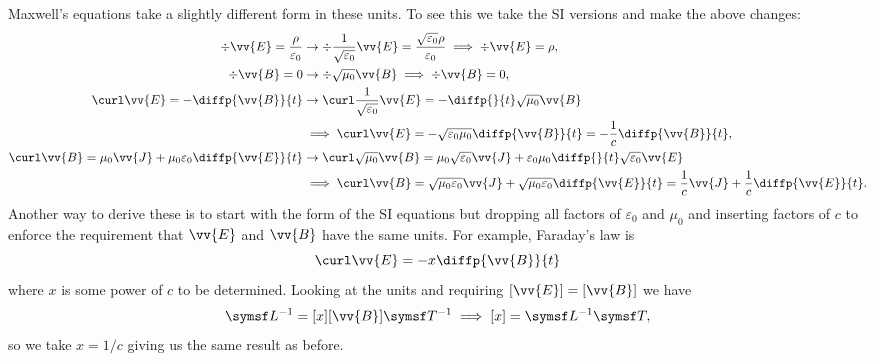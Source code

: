 Maxwell's equations take a slightly different form in these units.
To see this we take the SI versions and make the above changes:
\begin{alignat}{4}
    \div\vv{E} = \frac{\rho}{\varepsilon_0} &\to \div \frac{1}{\sqrt{\varepsilon_0}}\vv{E} = \frac{\sqrt{\varepsilon_0}\rho}{\varepsilon_0} \implies \div\vv{E} = \rho,\\
    \div\vv{B} = 0 &\to \div \sqrt{\mu_0}\vv{B} \implies \div\vv{B} = 0,\\
    \curl\vv{E} = -\diffp{\vv{B}}{t} &\to \curl\frac{1}{\sqrt{\varepsilon_0}}\vv{E} = -\diffp{}{t}\sqrt{\mu_0}\vv{B}\notag\\
    &\implies \curl\vv{E} = -\sqrt{\varepsilon_0\mu_0}\diffp{\vv{B}}{t} = -\frac{1}{c}\diffp{\vv{B}}{t},\\
    \curl\vv{B} = \mu_0\vv{J} + \mu_0\varepsilon_0\diffp{\vv{E}}{t} &\to \curl\sqrt{\mu_0}\vv{B} = \mu_0\sqrt{\varepsilon_0}\vv{J} + \varepsilon_0\mu_0\diffp{}{t}\sqrt{\varepsilon_0}\vv{E}\notag\\
    &\implies \curl\vv{B} = \sqrt{\mu_0\varepsilon_0}\vv{J} + \sqrt{\mu_0\varepsilon_0}\diffp{\vv{E}}{t} = \frac{1}{c}\vv{J} + \frac{1}{c}\diffp{\vv{E}}{t}.
\end{alignat}
Another way to derive these is to start with the form of the SI equations but dropping all factors of \(\varepsilon_0\) and \(\mu_0\) and inserting factors of \(c\) to enforce the requirement that \(\vv{E}\) and \(\vv{B}\) have the same units.
For example, Faraday's law is
\begin{equation}
    \curl\vv{E} = -x\diffp{\vv{B}}{t}
\end{equation}
where \(x\) is some power of \(c\) to be determined.
Looking at the units and requiring \([\vv{E}] = [\vv{B}]\) we have
\begin{equation}
    [\vv{E}] \dimension{L}^{-1} = [x] [\vv{B}] \dimension{T}^{-1} \implies [x] = \dimension{L}^{-1}\dimension{T},
\end{equation}
so we take \(x = 1/c\) giving us the same result as before.

